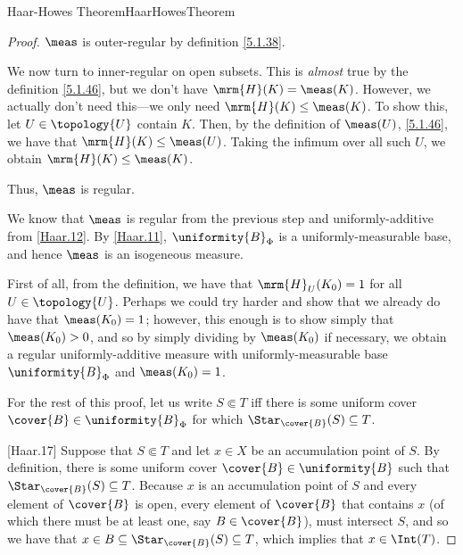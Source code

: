 \begin{thm}{Haar-Howes Theorem}{HaarHowesTheorem}
\begin{proof}
$\meas$ is outer-regular by definition \eqref{5.1.38}.

We now turn to inner-regular on open subsets.  This is \emph{almost} true by the definition \eqref{5.1.46}, but we don't have $\mrm{H}(K)=\meas (K)$.  However, we actually don't need this---we only need $\mrm{H}(K)\leq \meas (K)$.  To show this, let $U\in \topology{U}$ contain $K$.  Then, by the definition of $\meas (U)$, \eqref{5.1.46}, we have that $\mrm{H}(K)\leq \meas (U)$.  Taking the infimum over all such $U$, we obtain $\mrm{H}(K)\leq \meas (K)$.

Thus, $\meas$ is regular.

We know that $\meas$ is regular from the previous step and uniformly-additive from \cref{Haar.12}.  By \cref{Haar.11}, $\uniformity{B}_{\Phi}$ is a uniformly-measurable base, and hence $\meas$ is an isogeneous measure.

First of all, from the definition, we have that $\mrm{H}_U(K_0)=1$ for all $U\in \topology{U}$.  Perhaps we could try harder and show that we already do have that $\meas (K_0)=1$; however, this enough is to show simply that $\meas (K_0)>0$, and so by simply dividing by $\meas (K_0)$ if necessary, we obtain a regular uniformly-additive measure with uniformly-measurable base $\uniformity{B}_\Phi$ and $\meas (K_0)=1$.

For the rest of this proof, let us write $S\Subset T$ iff there is some uniform cover $\cover{B}\in \uniformity{B}_\Phi$ for which $\Star _{\cover{B}}(S)\subseteq T$.

[Haar.17]
Suppose that $S\Subset T$ and let $x\in X$ be an accumulation point of $S$.  By definition, there is some uniform cover $\cover{B}\in \uniformity{B}$ such that $\Star _{\cover{B}}(S)\subseteq T$.  Because $x$ is an accumulation point of $S$ and every element of $\cover{B}$ is open, every element of $\cover{B}$ that contains $x$ (of which there must be at least one, say $B\in \cover{B}$), must intersect $S$, and so we have that $x\in B\subseteq \Star _{\cover{B}}(S)\subseteq T$, which implies that $x\in \Int (T)$.


\end{proof}
\end{thm}
